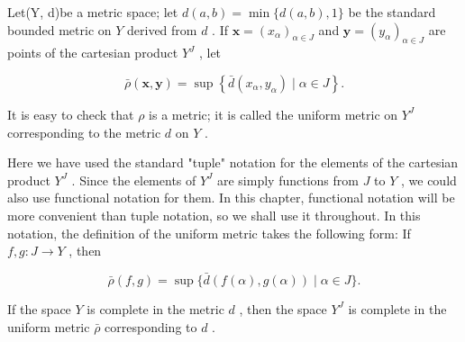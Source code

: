 \begin{definition} Let(Y, d)be a metric space; let \(d\left( {a,b}\right)  = \min \{ d\left( {a,b}\right) ,1\}\) be the standard bounded metric on \(Y\) derived from \(d\) . If \(\mathbf{x} = {\left( {x}_{\alpha }\right) }_{\alpha  \in  J}\) and \(\mathbf{y} = {\left( {y}_{\alpha }\right) }_{\alpha  \in  J}\) are points of the cartesian product \({Y}^{J}\) , let

\[
\bar{\rho }\left( {\mathbf{x},\mathbf{y}}\right)  = \sup \left\{  {\bar{d}\left( {{x}_{\alpha },{y}_{\alpha }}\right)  \mid  \alpha  \in  J}\right\}  .
\]

It is easy to check that \(\rho\) is a metric; it is called the uniform metric on \({Y}^{J}\) corresponding to the metric \(d\) on \(Y\) .
\end{definition}

Here we have used the standard "tuple" notation for the elements of the cartesian product \({Y}^{J}\) . Since the elements of \({Y}^{J}\) are simply functions from \(J\) to \(Y\) , we could also use functional notation for them. In this chapter, functional notation will be more convenient than tuple notation, so we shall use it throughout. In this notation, the definition of the uniform metric takes the following form: If \(f,g : J \rightarrow  Y\) , then

\[
\bar{\rho }\left( {f,g}\right)  = \sup \{ \bar{d}\left( {f\left( \alpha \right) ,g\left( \alpha \right) }\right)  \mid  \alpha  \in  J\} .
\]

\begin{theorem} If the space \(Y\) is complete in the metric \(d\) , then the space \({Y}^{J}\) is complete in the uniform metric \(\bar{\rho }\) corresponding to \(d\) .
\end{theorem}

